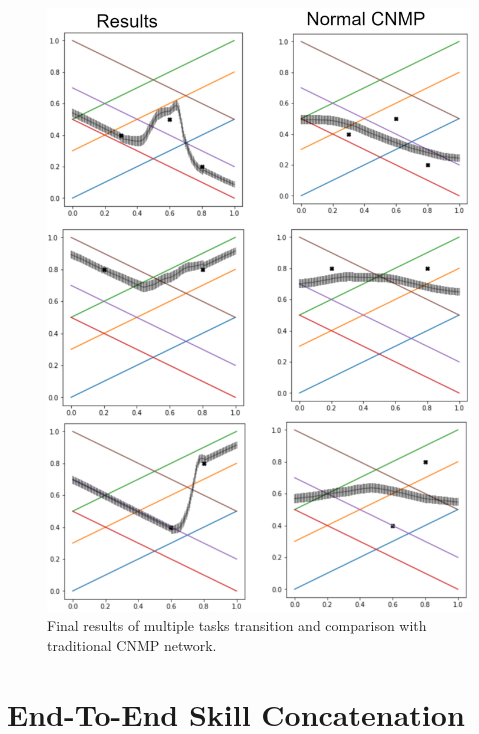\begin{figure}
    \centering
    \includegraphics[width=0.9\linewidth]{figures/tp-multiple-shift-results.png}
    \caption{ Final results of multiple tasks transition and comparison with traditional CNMP network. }
    \label{fig:tp-multiple-shift-results}
\end{figure}


\newpage
\section{End-To-End Skill Concatenation}


